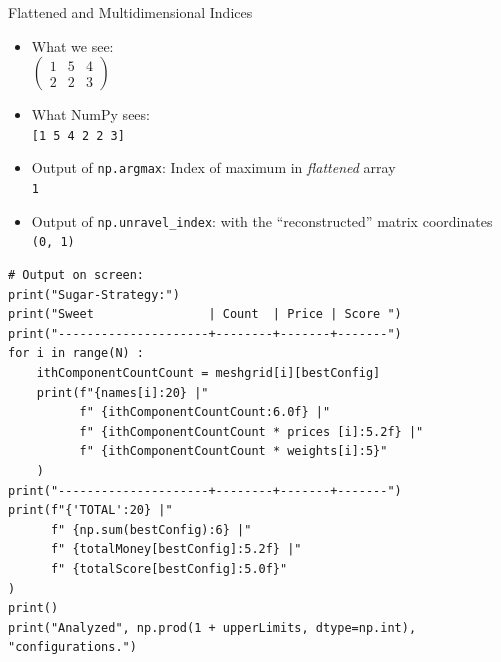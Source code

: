 
\begin{frame}[fragile]{Flattened and Multidimensional Indices}
%
\begin{itemize}
\item What we see:\\
	$\begin{pmatrix}
		1 & 5 & 4 \\
		2 & 2 & 3
	\end{pmatrix}$
\item What NumPy sees:\\
	\texttt{[1 5 4 2 2 3]}
\item Output of \texttt{np.argmax}: Index of maximum in \emph{flattened} array\\
	\texttt{1}
\item Output of \texttt{np.unravel\_index}:  with the \enquote{reconstructed} matrix coordinates\\
	\texttt{(0, 1)}
\end{itemize}
%
\end{frame}


\begin{frame}[fragile]
%
\begin{codebox}
\begin{verbatim}
# Output on screen:
print("Sugar-Strategy:")
print("Sweet                | Count  | Price | Score ")
print("---------------------+--------+-------+-------")
for i in range(N) :
    ithComponentCountCount = meshgrid[i][bestConfig]
    print(f"{names[i]:20} |"
          f" {ithComponentCountCount:6.0f} |"
          f" {ithComponentCountCount * prices [i]:5.2f} |"
          f" {ithComponentCountCount * weights[i]:5}"
    )
print("---------------------+--------+-------+-------")
print(f"{'TOTAL':20} |"
      f" {np.sum(bestConfig):6} |"
      f" {totalMoney[bestConfig]:5.2f} |"
      f" {totalScore[bestConfig]:5.0f}"
)
print()
print("Analyzed", np.prod(1 + upperLimits, dtype=np.int), "configurations.")
\end{verbatim}
\end{codebox}
%
\end{frame}


